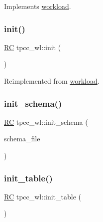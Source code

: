 Implements \hyperlink{classworkload_ac22d0558c3fc549b8b07347cebb95cb3}{workload}.

\mbox{\label{classtpcc__wl_a084aa9016fbc3abbb278f1c4bd15722c}} 
\subsubsection{\texorpdfstring{init()}{init()}}
{\footnotesize\ttfamily \hyperlink{global_8h_a78c49a674c810fdd03d20432f7be864a}{RC} tpcc\+\_\+wl\+::init (\begin{DoxyParamCaption}{ }\end{DoxyParamCaption})\hspace{0.3cm}{\ttfamily [virtual]}}



Reimplemented from \hyperlink{classworkload_a7cef7a7101c78e10082c99356e77a57c}{workload}.

\mbox{\label{classtpcc__wl_a79f6252410dd09efa03c40d7a362d4e1}} 
\subsubsection{\texorpdfstring{init\+\_\+schema()}{init\_schema()}}
{\footnotesize\ttfamily \hyperlink{global_8h_a78c49a674c810fdd03d20432f7be864a}{RC} tpcc\+\_\+wl\+::init\+\_\+schema (\begin{DoxyParamCaption}\item[{const char $\ast$}]{schema\+\_\+file }\end{DoxyParamCaption})}

\mbox{\label{classtpcc__wl_a84fd48d9c4ee95eb6176e9fdf9efd8b7}} 
\subsubsection{\texorpdfstring{init\+\_\+table()}{init\_table()}}
{\footnotesize\ttfamily \hyperlink{global_8h_a78c49a674c810fdd03d20432f7be864a}{RC} tpcc\+\_\+wl\+::init\+\_\+table (\begin{DoxyParamCaption}{ }\end{DoxyParamCaption})\hspace{0.3cm}{\ttfamily [virtual]}}



